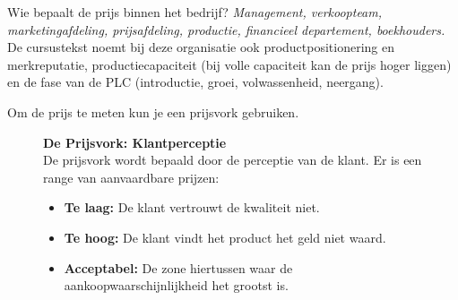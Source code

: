 \documentclass[a4paper,11pt]{article}
\begin{document}
\begin{description}
    \item{}
          Wie bepaalt de prijs binnen het bedrijf?
          \textit{Management, verkoopteam, marketingafdeling, prijsafdeling, productie, financieel departement, boekhouders.}
          De cursustekst noemt bij deze organisatie ook productpositionering en merkreputatie,
          productiecapaciteit (bij volle capaciteit kan de prijs hoger liggen) en de fase van de PLC (introductie, groei, volwassenheid, neergang).
\end{description}

Om de prijs te meten kun je een prijsvork gebruiken.
\begin{figure}[ht]
    \centering
    \begin{minipage}{0.45\textwidth}
        \textbf{De Prijsvork: Klantperceptie}\\
        De prijsvork wordt bepaald door de perceptie van de klant. Er is een range van aanvaardbare prijzen:
        \begin{itemize}
            \item \textbf{Te laag:} De klant vertrouwt de kwaliteit niet.
            \item \textbf{Te hoog:} De klant vindt het product het geld niet waard.
            \item \textbf{Acceptabel:} De zone hiertussen waar de aankoopwaarschijnlijkheid het grootst is.
        \end{itemize}
    \end{minipage}%
    \hfill
    \begin{minipage}{0.55\textwidth}
        \centering
\end{minipage}
\end{figure}
\end{document}
